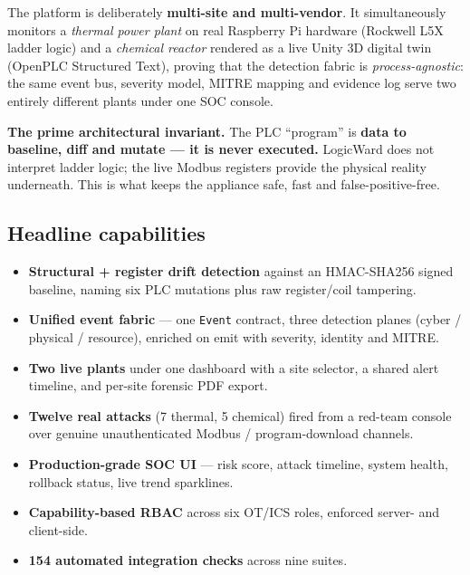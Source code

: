 \documentclass[11pt,a4paper]{article}
\newcommand{\code}[1]{\texttt{\small #1}}
\begin{document}
The platform is deliberately \textbf{multi-site and multi-vendor}. It simultaneously monitors a
\emph{thermal power plant} on real Raspberry Pi hardware (Rockwell L5X ladder logic) and a
\emph{chemical reactor} rendered as a live Unity 3D digital twin (OpenPLC Structured Text),
proving that the detection fabric is \emph{process-agnostic}: the same event bus, severity model,
MITRE mapping and evidence log serve two entirely different plants under one SOC console.

\begin{keybox}
\textbf{The prime architectural invariant.} The PLC ``program'' is \textbf{data to baseline,
diff and mutate --- it is never executed.} LogicWard does not interpret ladder logic; the live
Modbus registers provide the physical reality underneath. This is what keeps the appliance
safe, fast and false-positive-free.
\end{keybox}

\subsection{Headline capabilities}
\begin{itemize}[leftmargin=1.3em,itemsep=2pt]
  \item \textbf{Structural + register drift detection} against an HMAC-SHA256 signed baseline,
        naming six PLC mutations plus raw register/coil tampering.
  \item \textbf{Unified event fabric} --- one \code{Event} contract, three detection planes
        (cyber / physical / resource), enriched on emit with severity, identity and MITRE.
  \item \textbf{Two live plants} under one dashboard with a site selector, a shared alert
        timeline, and per-site forensic PDF export.
  \item \textbf{Twelve real attacks} (7 thermal, 5 chemical) fired from a red-team console over
        genuine unauthenticated Modbus / program-download channels.
  \item \textbf{Production-grade SOC UI} --- risk score, attack timeline, system health,
        rollback status, live trend sparklines.
  \item \textbf{Capability-based RBAC} across six OT/ICS roles, enforced server- and client-side.
  \item \textbf{154 automated integration checks} across nine suites.
\end{itemize}

\end{document}
